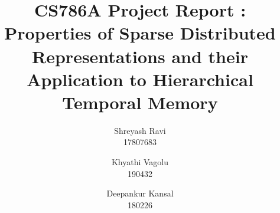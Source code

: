 \documentclass{article}
\begin{document}
\title{CS786A Project Report : Properties of Sparse Distributed Representations and their Application to Hierarchical Temporal Memory}
\author{
    Shreyash Ravi\\
    17807683\\
    \and
    Khyathi Vagolu\\
    190432\\
    \and
    Deepankur Kansal\\
    180226\\
}
\date{}
\maketitle
\end{document}
